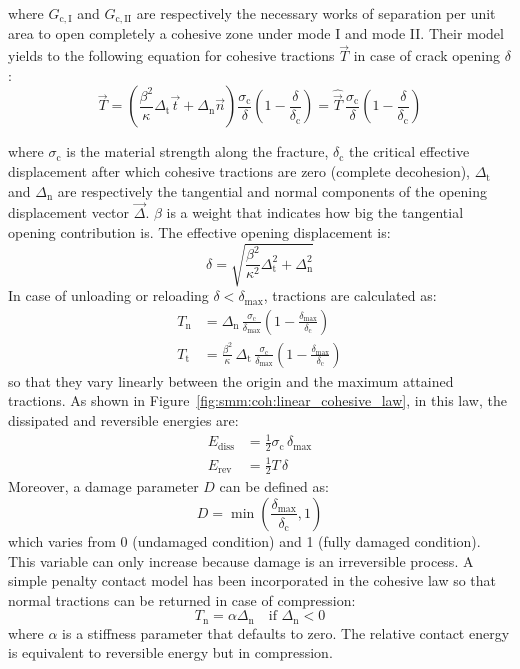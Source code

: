 where $G_\mathrm{c, I}$ and $G_\mathrm{c, II}$ are respectively the
necessary works of separation per unit area to open completely a
cohesive zone under mode I and mode II. Their model yields to the
following equation for cohesive tractions $\vec{T}$ in case of crack
opening ${\delta}$:
\begin{equation}
  \label{eq:smm:coh:tractions}
  \vec{T} = \left( \frac{\beta^2}{\kappa} \Delta_\mathrm{t} \vec{t} +
    \Delta_\mathrm{n} \vec{n} \right)
  \frac{\sigma_\mathrm{c}}{\delta}
  \left( 1- \frac{\delta}{\delta_\mathrm{c}} \right)
  = \hat{\vec{T}}\, \frac{\sigma_\mathrm{c}}{\delta}
  \left( 1- \frac{\delta}{\delta_\mathrm{c}} \right)
\end{equation}

where $\sigma_\mathrm{c}$ is the material strength along the fracture,
$\delta_\mathrm{c}$ the critical effective displacement after which
cohesive tractions are zero (complete decohesion), $\Delta_\mathrm{t}$
and $\Delta_\mathrm{n}$ are respectively the tangential and normal
components of the opening displacement vector $\vec{\Delta}$. $\beta$
is a weight that indicates how big the tangential opening contribution
is. The effective opening displacement is:
\begin{equation}
  \delta = \sqrt{\frac{\beta^2}{\kappa^2} \Delta_\mathrm{t}^2 +
    \Delta_\mathrm{n}^2}
\end{equation}
In case of unloading or reloading $\delta < \delta_\mathrm{max}$,
tractions are calculated as:
\begin{align}
  T_\mathrm{n} &= \Delta_\mathrm{n}\,
  \frac{\sigma_\mathrm{c}}{\delta_\mathrm{max}}
  \left( 1- \frac{\delta_\mathrm{max}}{\delta_\mathrm{c}} \right) \\
  T_\mathrm{t} &= \frac{\beta^2}{\kappa}\, \Delta_\mathrm{t}\,
  \frac{\sigma_\mathrm{c}}{\delta_\mathrm{max}}
  \left( 1- \frac{\delta_\mathrm{max}}{\delta_\mathrm{c}} \right)
\end{align}
so that they vary linearly between the origin and the maximum attained
tractions. As shown in Figure~\ref{fig:smm:coh:linear_cohesive_law},
in this law, the dissipated and reversible energies are:
\begin{align}
  E_\mathrm{diss} &= \frac{1}{2} \sigma_\mathrm{c}\, \delta_\mathrm{max}\\[1ex]
  E_\mathrm{rev} &= \frac{1}{2} T\, \delta
\end{align}
Moreover, a damage parameter $D$ can be defined as:
\begin{equation}
  D = \min \left(
    \frac{\delta_\mathrm{max}}{\delta_\mathrm{c}},1 \right)
\end{equation}
which varies from 0 (undamaged condition) and 1 (fully
damaged condition). This variable can only increase because damage is
an irreversible process. A simple penalty contact model has been incorporated
in the cohesive law so that normal tractions can be returned in
case of compression:
\begin{equation}
  T_\mathrm{n} = \alpha \Delta_\mathrm{n} \quad\text{if
    $\Delta_\mathrm{n} < 0$}
\end{equation}
where $\alpha$ is a stiffness parameter that defaults to zero. The
relative contact energy is equivalent to reversible energy but in
compression.

